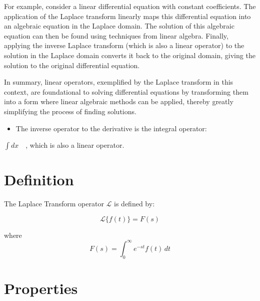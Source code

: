 \documentclass[
  letterpaper,
  DIV=11,
  numbers=noendperiod]{scrreprt}
\providecommand{\tightlist}{%
  \setlength{\itemsep}{0pt}\setlength{\parskip}{0pt}}
\theoremstyle{plain}
\theoremstyle{remark}
\begin{document}
\begin{tcolorbox}
For example, consider a linear differential equation with constant
coefficients. The application of the Laplace transform linearly maps
this differential equation into an algebraic equation in the Laplace
domain. The solution of this algebraic equation can then be found using
techniques from linear algebra. Finally, applying the inverse Laplace
transform (which is also a linear operator) to the solution in the
Laplace domain converts it back to the original domain, giving the
solution to the original differential equation.

In summary, linear operators, exemplified by the Laplace transform in
this context, are foundational to solving differential equations by
transforming them into a form where linear algebraic methods can be
applied, thereby greatly simplifying the process of finding solutions.

\end{tcolorbox}

\begin{itemize}
\tightlist
\item
  The inverse operator to the derivative is the integral operator:
\end{itemize}

\(\int dx\quad\), which is also a linear operator.

\section{Definition}\label{definition-3}

\begin{tcolorbox}[enhanced jigsaw, title=\textcolor{quarto-callout-note-color}{\faInfo}\hspace{0.5em}{Definition}, colbacktitle=quarto-callout-note-color!10!white, opacitybacktitle=0.6, opacityback=0, rightrule=.15mm, breakable, titlerule=0mm, colback=white, bottomtitle=1mm, colframe=quarto-callout-note-color-frame, toprule=.15mm, leftrule=.75mm, toptitle=1mm, arc=.35mm, bottomrule=.15mm, left=2mm, coltitle=black]

The Laplace Transform operator \(\mathscr{L}\) is defined by:

\[\mathscr{L}\{f(t)\}=F(s)\]

where \[\boxed{F(s)=\int_0^\infty e^{-st} f(t)\,dt}\]

\end{tcolorbox}

\section{Properties}\label{properties}
\end{document}
